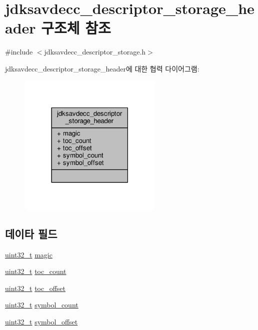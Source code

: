 \hypertarget{structjdksavdecc__descriptor__storage__header}{}\section{jdksavdecc\+\_\+descriptor\+\_\+storage\+\_\+header 구조체 참조}
\label{structjdksavdecc__descriptor__storage__header}


{\ttfamily \#include $<$jdksavdecc\+\_\+descriptor\+\_\+storage.\+h$>$}



jdksavdecc\+\_\+descriptor\+\_\+storage\+\_\+header에 대한 협력 다이어그램\+:
\nopagebreak
\begin{figure}[H]
\begin{center}
\leavevmode
\includegraphics[width=194pt]{structjdksavdecc__descriptor__storage__header__coll__graph}
\end{center}
\end{figure}
\subsection*{데이타 필드}
\begin{DoxyCompactItemize}
\item 
\hyperlink{parse_8c_a6eb1e68cc391dd753bc8ce896dbb8315}{uint32\+\_\+t} \hyperlink{structjdksavdecc__descriptor__storage__header_a57f54349f4fd1cbbb52058812e146af2}{magic}
\item 
\hyperlink{parse_8c_a6eb1e68cc391dd753bc8ce896dbb8315}{uint32\+\_\+t} \hyperlink{structjdksavdecc__descriptor__storage__header_a22c14d132b1eabf9f84417876ad8022b}{toc\+\_\+count}
\item 
\hyperlink{parse_8c_a6eb1e68cc391dd753bc8ce896dbb8315}{uint32\+\_\+t} \hyperlink{structjdksavdecc__descriptor__storage__header_a633a6afa4bfb208d943ddadb31e983ad}{toc\+\_\+offset}
\item 
\hyperlink{parse_8c_a6eb1e68cc391dd753bc8ce896dbb8315}{uint32\+\_\+t} \hyperlink{structjdksavdecc__descriptor__storage__header_a6af37e9b121cd752f19687265d421a1f}{symbol\+\_\+count}
\item 
\hyperlink{parse_8c_a6eb1e68cc391dd753bc8ce896dbb8315}{uint32\+\_\+t} \hyperlink{structjdksavdecc__descriptor__storage__header_a8c57a9eff61cd27a604d84ff1c777e61}{symbol\+\_\+offset}
\end{DoxyCompactItemize}


